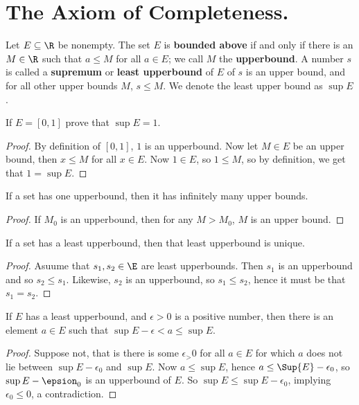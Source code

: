 
\section{The Axiom of Completeness.}

\begin{definition}
  Let $E \subseteq \R$ be nonempty. The set $E$ is  \textbf{bounded above} if and only if there is an $M \in \R$ such that 
  $a \leq M$ for all $a \in E$; we call $M$ the \textbf{upperbound}. A number $s$ is called a \textbf{supremum} or \textbf{least upperbound} 
  of $E$ of $s$ is an upper bound, and for all other upper bounds $M$, $s \leq M$. We denote the least upper bound as $\sup{E}$.
\end{definition}

\begin{example}
  If $E=[0,1]$ prove that $\sup{E}=1$.
\end{example}
\begin{proof}
  By definition of $[0,1]$, $1$ is an upperbound. Now let $M \in E$ be an upper bound, then $x \leq M$ for all $x \in E$. Now 
  $1 \in E$, so $1 \leq M$, so by definition, we get that $1=\sup{E}$.
\end{proof}

\begin{remark}
  If a set has one upperbound, then it has infinitely many upper bounds.
\end{remark}
\begin{proof}
  If $M_0$ is an upperbound, then for any $M>M_0$, $M$ is an upper bound.
\end{proof}

\begin{remark}
  If a set has a least upperbound, then that least upperbound is unique.
\end{remark}
\begin{proof}
  Asuume that $s_1,s_2 \in \E$ are least upperbounds. Then $s_1$ is an upperbound and so $s_2 \leq s_1$. Likewise, $s_2$ is 
  an upperbound, so $s_1 \leq s_2$, hence it must be that $s_1=s_2$.
\end{proof}

\begin{theorem}
  If $E$ has a least upperbound, and $\epsilon>0$ is a positive number, then there is an element $a \in E$ such that $\sup{E}-\epsilon < a \leq \sup{E}$.
\end{theorem}
\begin{proof}
  Suppose not, that is there is some $\epsilon_>0$ for all $a \in E$ for which $a$ does not lie between $\sup{E}-\epsilon_0$ 
  and $\sup{E}$. Now $a \leq \sup{E}$, hence $a \leq \Sup{E}-\epsilon_0$, so $\sup{E}-\epsion_0$ is an upperbound of $E$. So 
  $\sup{E} \leq \sup{E}-\epsilon_0$, implying $\epsilon_0 \leq 0$, a contradiction.
\end{proof}

